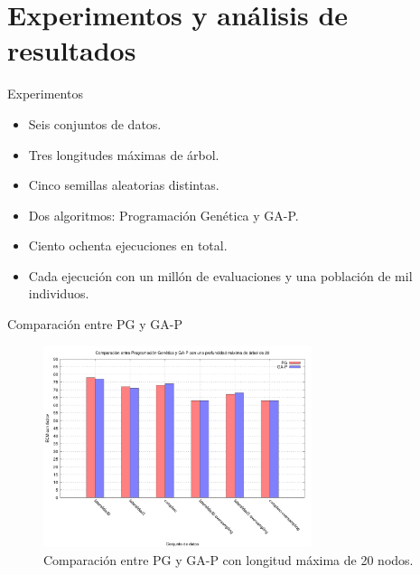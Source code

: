 \documentclass{beamer}
\begin{document}
\section{Experimentos y análisis de resultados}

\begin{frame}{Experimentos}

	\begin{itemize}
		\item Seis conjuntos de datos.
		\item Tres longitudes máximas de árbol.
		\item Cinco semillas aleatorias distintas.
		\item Dos algoritmos: Programación Genética y GA-P.
		\item Ciento ochenta ejecuciones en total.
		\item Cada ejecución con un millón de evaluaciones y una población de mil individuos.
	\end{itemize}

\end{frame}


\begin{frame}{Comparación entre PG y GA-P}

	\begin{figure}[H]
	    \centering
		  \includegraphics[width=0.7\textwidth]{comparacion_pg_gap_20.png}
		  \caption{Comparación entre PG y GA-P con longitud máxima de 20 nodos.}\label{fig:cmp_pg_gap_20}

	\end{figure}


\end{frame}
\end{document}
